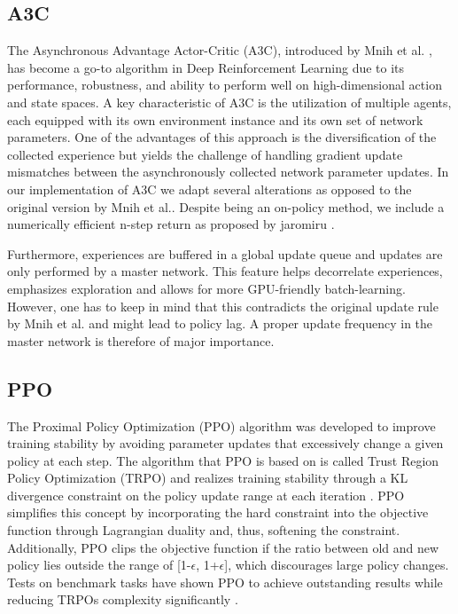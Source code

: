 \documentclass[letterpaper, 10 pt, conference]{ieeeconf}  %
\begin{document}
\subsection{A3C}
The Asynchronous Advantage Actor-Critic (A3C), introduced by Mnih et al. \cite{mnihAsynchronousMethodsDeep2016}, has become a go-to algorithm in 
Deep Reinforcement Learning due to its performance, robustness, and ability to perform well on high-dimensional action and state spaces. 
A key characteristic of A3C is the utilization of multiple agents, each equipped with its own environment instance and its own set of network parameters. 
One of the advantages of this approach is the diversification of the collected experience but yields the challenge of handling gradient update 
mismatches between the asynchronously collected network parameter updates. 
In our implementation of A3C we adapt several alterations as opposed to the original version by Mnih et al.. Despite being an on-policy method, we include a numerically efficient n-step return as proposed by jaromiru \cite{janischLetMakeA3C}. %

Furthermore, experiences are buffered in a global update 
queue and updates are only performed by a master network. This feature helps decorrelate experiences, emphasizes exploration and allows for more GPU-friendly
batch-learning. However, one has to keep in mind that this contradicts the original update rule by Mnih et al. and might lead to policy lag. A proper update 
frequency in the master network is therefore of major importance.

\subsection{PPO}

The Proximal Policy Optimization (PPO) algorithm was developed to improve training stability by avoiding parameter updates that excessively change a given policy at each step. The algorithm that PPO is based on is called Trust Region Policy Optimization (TRPO) and realizes training stability through a KL divergence constraint on the policy update range at each iteration \cite{pmlr-v37-schulman15}. PPO simplifies this concept by incorporating the hard constraint into the objective function through Lagrangian duality and, thus, softening the constraint. Additionally, PPO clips the objective function if the ratio between old and new policy lies outside the range of [1-$\epsilon$, 1+$\epsilon$], which discourages large policy changes. Tests on benchmark tasks have shown PPO to achieve outstanding results while reducing TRPOs complexity significantly \cite{DBLP:journals/corr/SchulmanWDRK17}.
\end{document}
